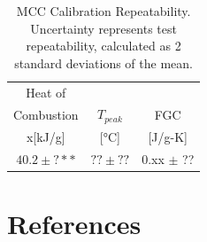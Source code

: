 \documentclass[12pt]{article}
\begin{document}
\begin{table}
\begin{center}
\caption[MCC Calibration Repeatability]{MCC Calibration Repeatability. Uncertainty represents test repeatability, calculated as 2 standard deviations of the mean.}
\label{MCC}
\begin{tabular}{ccc}
\hline
Heat of		&  & \\
Combustion    	& $T_{peak}$ & FGC\\
x[kJ/g]      	    	& [°C] & [J/g-K]\\
 \hline
$40.2\pm?**$	   & 	$??\pm ??$ & 0.xx $\pm$ ??\\
\hline
\end{tabular}
\end{center}
\end{table}

\clearpage

\section*{References}


\end{document}

